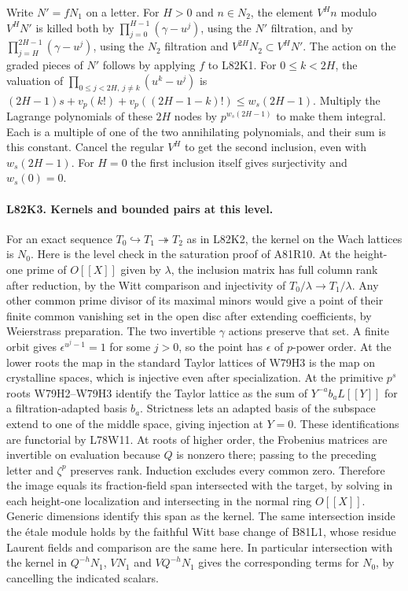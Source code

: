 Write $N'=fN_1$ on a letter. For $H>0$ and $n\in N_2$, the
element $V^Hn$ modulo $V^HN'$ is killed both by
$\prod_{j=0}^{H-1}(\gamma-u^j)$, using the $N'$ filtration,
and by $\prod_{j=H}^{2H-1}(\gamma-u^j)$, using the $N_2$
filtration and $V^{2H}N_2\subset V^HN'$. The action on the
graded pieces of $N'$ follows by applying $f$ to L82K1.
For $0\le k<2H$, the valuation of
$\prod_{0\le j<2H,\ j\ne k}(u^k-u^j)$ is
$(2H-1)s+v_p(k!)+v_p((2H-1-k)!)\le w_s(2H-1)$.
Multiply the Lagrange polynomials of these $2H$ nodes by
$p^{w_s(2H-1)}$ to make them integral. Each is a multiple of
one of the two annihilating polynomials, and their sum is this
constant. Cancel the regular $V^H$ to get the second inclusion,
even with $w_s(2H-1)$. For $H=0$ the first inclusion itself
gives surjectivity and $w_s(0)=0$.

\paragraph{L82K3. Kernels and bounded pairs at this level.}
For an exact sequence $T_0\hookrightarrow T_1\twoheadrightarrow
T_2$ as in L82K2, the kernel on the Wach lattices is $N_0$.
Here is the level check in the saturation proof of A81R10.
At the height-one prime of $O[[X]]$ given by $\lambda$, the
inclusion matrix has full column rank after reduction, by the Witt
comparison and injectivity of $T_0/\lambda\to T_1/\lambda$.
Any other common prime divisor of its maximal minors would give
a point of their finite common vanishing set in the open disc
after extending coefficients, by Weierstrass preparation.
The two invertible $\gamma$ actions preserve that set. A finite
orbit gives $\epsilon^{u^j-1}=1$ for some $j>0$, so the point
has $\epsilon$ of $p$-power order. At the lower roots the map in
the standard Taylor lattices of W79H3 is the map on crystalline
spaces, which is injective even after specialization. At the
primitive $p^s$ roots W79H2--W79H3 identify the Taylor lattice
as the sum of $Y^{-a}b_aL[[Y]]$ for a filtration-adapted
basis $b_a$. Strictness lets an adapted basis of the subspace
extend to one of the middle space, giving injection at $Y=0$.
These identifications are functorial by L78W11. At roots of
higher order, the Frobenius matrices are invertible on evaluation
because $Q$ is nonzero there; passing to the preceding letter
and $\zeta^p$ preserves rank. Induction excludes every common
zero. Therefore the image equals its fraction-field span
intersected with the target, by solving in each height-one
localization and intersecting in the normal ring $O[[X]]$.
Generic dimensions identify this span as the kernel. The same
intersection inside the \'etale module holds by the faithful Witt
base change of B81L1, whose residue Laurent fields and comparison
are the same here. In particular intersection with the kernel in
$Q^{-h}N_1$, $VN_1$ and $VQ^{-h}N_1$ gives the corresponding
terms for $N_0$, by cancelling the indicated scalars.

